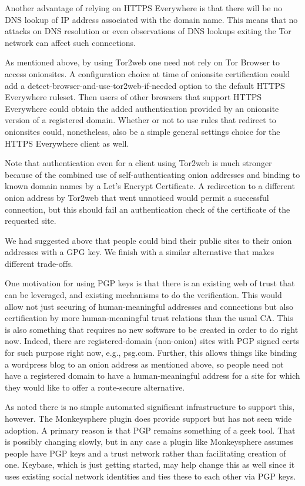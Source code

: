 \documentclass[10pt, conference, compsocconf]{styles/IEEEtran}
\begin{document}
Another advantage of relying on HTTPS Everywhere is that there will
be no DNS lookup of IP address associated with the domain name.
This means that no attacks on DNS resolution or even observations
of DNS lookups exiting the Tor network can affect such connections.

As mentioned above, by using Tor2web one need not rely on Tor Browser
to access onionsites. A configuration choice at time of onionsite
certification could add a detect-browser-and-use-tor2web-if-needed
option to the default HTTPS Everywhere ruleset. Then users of other
browsers that support HTTPS Everywhere could obtain the added
authentication provided by an onionsite version of a registered
domain. Whether or not to use rules that redirect to onionsites
could, nonetheless, also be a simple general settings choice for the
HTTPS Everywhere client as well.

Note that authentication even for a client using Tor2web is much
stronger because of the combined use of self-authenticating onion
addresses and binding to known domain names by a Let's Encrypt
Certificate.  A redirection to a different onion address by Tor2web
that went unnoticed would permit a successful connection, but this
should fail an authentication check of the certificate of the
requested site.


We had suggested above that people could bind their public sites to
their onion addresses with a GPG key.  We finish with a similar alternative
that makes different trade-offs.

One motivation for using PGP keys is that there is an existing web of
trust that can be leveraged, and existing mechanisms to do the
verification.  This would allow not just securing of human-meaningful
addresses and connections but also certification by more
human-meaningful trust relations than the usual CA.  This is also
something that requires no new software to be created in order to do
right now. Indeed, there are registered-domain (non-onion) sites with
PGP signed certs for such purpose right now, e.g., psg.com.
Further, this allows things like binding a wordpress blog to an onion
address as mentioned above, so people need not have a registered domain
to have a human-meaningful address for a site for which
they would like to offer a route-secure alternative.

As noted there is no simple automated significant infrastructure to
support this, however. The Monkeysphere plugin does provide support
but has not seen wide adoption.  A primary reason is that PGP remains
something of a geek tool. That is possibly changing slowly, but in any
case a plugin like Monkeysphere assumes people have PGP keys and a
trust network rather than facilitating creation of one. Keybase, which
is just getting started, may help change this as well since it
uses existing social network identities and ties these to each
other via PGP keys.
\end{document}
